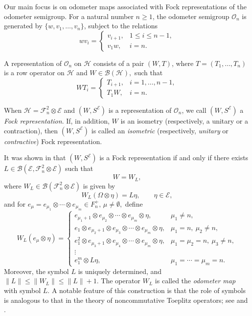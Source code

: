 \documentclass[12pt]{amsart}
\theoremstyle{definition}
\theoremstyle{remark}
\newcommand{\clb}{\mathcal{B}}
\newcommand{\cle}{\mathcal{E}}
\newcommand{\clh}{\mathcal{H}}
\newcommand{\clf}{\mathcal{F}}
\newcommand{\clo}{\mathcal{O}}
\numberwithin{equation}{section}
\begin{document}
Our main focus is on odometer maps associated with Fock representations of the odometer semigroup. For a natural number $n\ge 1$, the odometer semigroup $\clo_n$ is generated by $\{w, v_1,\ldots,v_n\}$, subject to the relations
\[
wv_i=
\begin{cases}
v_{i+1}, & 1\le i\le n-1,\\
v_1w, & i=n.
\end{cases}
\]

A representation of \(\clo_n\) on \(\clh\) consists of a pair \((W,T)\), where $T=(T_1,\ldots,T_n)$
is a row operator on $\clh$ and $W\in \clb(\clh),$
such that
\[
WT_i=
\begin{cases}
T_{i+1}, & i=1,\ldots,n-1,\\[4pt]
T_1W, & i=n.
\end{cases}
\]

When $\clh=\clf_n^2\otimes \cle$ and $(W,S^\cle)$ is a representation of $\clo_n$, we call $(W,S^\cle)$ a \emph{Fock representation}. If, in addition, $W$ is an isometry (respectively, a unitary or a contraction), then $(W,S^\cle)$ is called an \emph{isometric} (respectively, \emph{unitary} or \emph{contractive}) Fock representation.

It was shown in \cite[Theorem 2.2]{mansi2025} that $(W,S^{\cle})$ is a Fock representation if and only if there exists $L \in \clb(\cle,\clf_n^2 \otimes \cle)$
such that
\[
W=W_L,
\]
where $W_L \in \clb(\clf_n^2 \otimes \cle)$ is given by
\[
W_L(\Omega \otimes \eta)=L\eta,
\qquad \eta \in \cle,
\]
and for $e_\mu=e_{\mu_1}\otimes \cdots \otimes e_{\mu_m}\in  F_n^+,\, \mu\neq \emptyset,$
define
\begin{equation}\label{eq:defn-W_L}
 W_L(e_\mu\otimes \eta)=
\begin{cases}
e_{\mu_1+1}\otimes e_{\mu_2}\otimes \cdots \otimes e_{\mu_m}\otimes \eta,
& \mu_1\neq n,\\[6pt]
e_1\otimes e_{\mu_2+1}\otimes e_{\mu_3}\otimes \cdots \otimes e_{\mu_m}\otimes \eta,
& \mu_1=n,\ \mu_2\neq n,\\[6pt]
e_1^{ 2}\otimes e_{\mu_3+1}\otimes e_{\mu_4}\otimes \cdots \otimes e_{\mu_m}\otimes \eta,
& \mu_1=\mu_2=n,\ \mu_3\neq n,\\[6pt]
\vdots\\[4pt]
e_1^{ m}\otimes L\eta,
& \mu_1=\cdots=\mu_m=n.
\end{cases}   
\end{equation}
Moreover, the symbol $L$ is uniquely determined, and $\|L\|\le \|W_L\|\le \|L\|+1.$
The operator $W_L$ is called the \emph{odometer map} with symbol $L$. A notable feature of this construction is that the role of symbols is analogous to that in the theory of noncommutative Toeplitz operators; see \cite{popescu} and \cite[Remark 2.4]{mansi2025}. 
\end{document}
